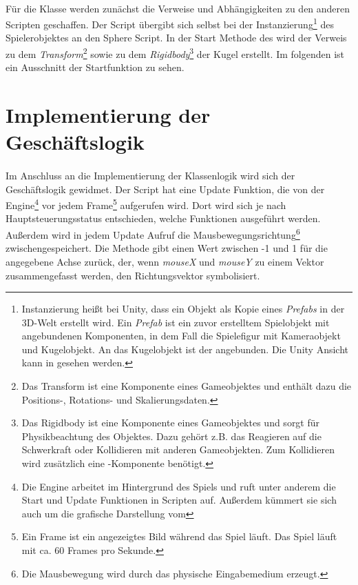\paragraph{}
Für die  Klasse werden zunächst die Verweise und Abhängigkeiten zu den anderen Scripten geschaffen. Der  Script übergibt sich selbst bei der Instanzierung\footnote{Instanzierung heißt bei Unity, dass ein Objekt als Kopie eines \textit{Prefabs} in der 3D-Welt erstellt wird. Ein \textit{Prefab} ist ein zuvor erstelltem Spielobjekt mit angebundenen Komponenten, in dem Fall die Spielefigur mit Kameraobjekt und Kugelobjekt. An das Kugelobjekt ist der  angebunden. Die Unity Ansicht kann in  gesehen werden.} des Spielerobjektes an den Sphere Script. In  der Start Methode des  wird der Verweis zu dem \textit{Transform}\footnote{Das Transform ist eine Komponente eines Gameobjektes und enthält dazu die Positions-, Rotations- und Skalierungsdaten. } sowie zu dem \textit{Rigidbody}\footnote{Das Rigidbody ist eine Komponente eines Gameobjektes und sorgt für Physikbeachtung des Objektes. Dazu gehört z.B. das Reagieren auf die Schwerkraft oder Kollidieren mit anderen Gameobjekten. Zum Kollidieren wird zusätzlich eine -Komponente benötigt.} der Kugel erstellt. Im folgenden ist ein Ausschnitt der Startfunktion zu sehen.



\section{Implementierung der Geschäftslogik}
\paragraph{}
Im Anschluss an die Implementierung der Klassenlogik wird sich der Geschäftslogik gewidmet. Der  Script hat eine Update Funktion, die von der Engine\footnote{Die Engine arbeitet im Hintergrund des Spiels und ruft unter anderem die Start und Update Funktionen in Scripten auf. Außerdem kümmert sie sich auch um die grafische Darstellung vom} vor jedem Frame\footnote{Ein Frame ist ein angezeigtes Bild während das Spiel läuft. Das Spiel läuft mit ca. 60 Frames pro Sekunde.} aufgerufen wird. Dort wird sich je nach Hauptsteuerungsstatus entschieden, welche Funktionen ausgeführt werden. Außerdem wird in jedem Update Aufruf die Mausbewegungsrichtung\footnote{Die Mausbewegung wird durch das physische Eingabemedium erzeugt.} zwischengespeichert. Die Methode  gibt einen Wert zwischen -1 und 1 für die angegebene Achse zurück, der, wenn \textit{mouseX} und \textit{mouseY} zu einem Vektor zusammengefasst werden, den Richtungsvektor symbolisiert.

